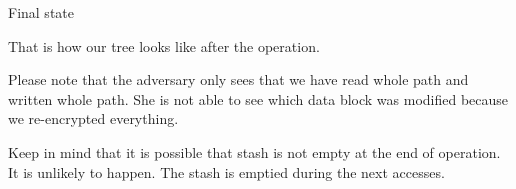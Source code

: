	\exampleFrame%
		{Final state}
		{
			\selectedtrue%
			\pathreadtrue%
			\nodeonenewtrue%
			\nodetwonewtrue%
			\nodethreenewtrue%
			\nodefournewtrue%
		}
		{}
		{}
		{
			That is how our tree looks like after the operation.

			Please note that the adversary only sees that we have read whole path and written whole path.
			She is not able to see which data block was modified because we re-encrypted everything.

			Keep in mind that it is possible that stash is not empty at the end of operation.
			It is unlikely to happen.
			The stash is emptied during the next accesses.
		}
